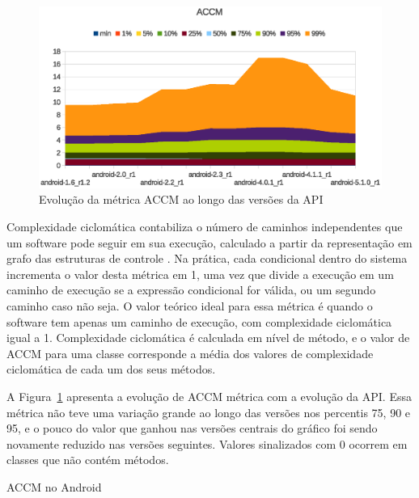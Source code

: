 \begin{figure}[!htb]
\centering
\includegraphics [keepaspectratio=true,scale=0.85]{figuras/graphs/accm_android.eps}
\caption{Evolução da métrica ACCM ao longo das versões da API}
\label{fig:accm_android}
\end{figure}

Complexidade ciclomática contabiliza o número de caminhos independentes que um software pode seguir em sua execução, calculado a partir da representação em grafo das estruturas de controle \cite{shepperd1988critique}. Na prática, cada condicional dentro do sistema incrementa o valor desta métrica em 1, uma vez que divide a execução em um caminho de execução se a expressão condicional for válida, ou um segundo caminho caso não seja. O valor teórico ideal para essa métrica é quando o software tem apenas um caminho de execução, com complexidade ciclomática igual a 1. Complexidade ciclomática é calculada em nível de método, e o valor de ACCM para uma classe corresponde a média dos valores de complexidade ciclomática de cada um dos seus métodos.

A Figura~\ref{fig:accm_android} apresenta a evolução de ACCM métrica com a evolução da API. Essa métrica não teve uma variação grande ao longo das versões nos percentis 75, 90 e 95, e o pouco do valor que ganhou nas versões centrais do gráfico foi sendo novamente reduzido nas versões seguintes. Valores sinalizados com 0 ocorrem em classes que não contém métodos.

\begin{table}[!htb]
\centering
{}

\caption{ACCM no Android}
\label{tab:accm_android}
\end{table}

